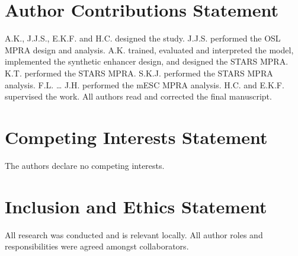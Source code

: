 \section{Author Contributions Statement}

A.K., J.J.S., E.K.F. and H.C. designed the study. J.J.S. performed the OSL MPRA design and analysis. A.K. trained, evaluated and interpreted the model, implemented the synthetic enhancer design, and designed the STARS MPRA. K.T. performed the STARS MPRA. S.K.J. performed the STARS MPRA analysis. F.L. … J.H. performed the mESC MPRA analysis. H.C. and E.K.F. supervised the work. All authors read and corrected the final manuscript.

\section{Competing Interests Statement}

The authors declare no competing interests.

\section{Inclusion and Ethics Statement}

All research was conducted and is relevant locally. All author roles and responsibilities were agreed amongst collaborators.
